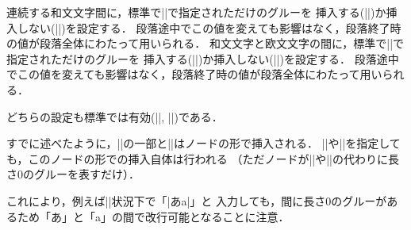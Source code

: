 \documentclass[a4paper,11pt,nomag,dvipdfmx]{jsarticle}
\begin{document}
\begin{cslist}
  連続する和文文字間に，標準で|\kanjiskip|で指定されただけのグルーを
  挿入する(|\autospacing|)か挿入しない(|\noautospacing|)を設定する．
  段落途中でこの値を変えても影響はなく，段落終了時の値が段落全体にわたって用いられる．
  和文文字と欧文文字の間に，標準で|\xkanjiskip|で指定されただけのグルーを
  挿入する(|\autoxspacing|)か挿入しない(|\noautoxspacing|)を設定する．
  段落途中でこの値を変えても影響はなく，段落終了時の値が段落全体にわたって用いられる．
\end{cslist}

どちらの設定も標準では有効(|\autospacing|, |\autoxspacing|)である．
\begin{dangerous}
  すでに述べたように，|\kanjiskip|の一部と|\xkanjiskip|はノードの形で挿入される．
  |\noautospacing|や|\noautoxspacing|を指定しても，このノードの形での挿入自体は行われる
 （ただノードが|\kanjiskip|や|\xkanjiskip|の代わりに長さ0のグルーを表すだけ）．

  これにより，例えば|\noautoxspacing|状況下で「|あa|」と
  入力しても，間に長さ0のグルーがあるため「あ」と「a」の間で改行可能となることに注意．
\end{dangerous}
\end{document}
